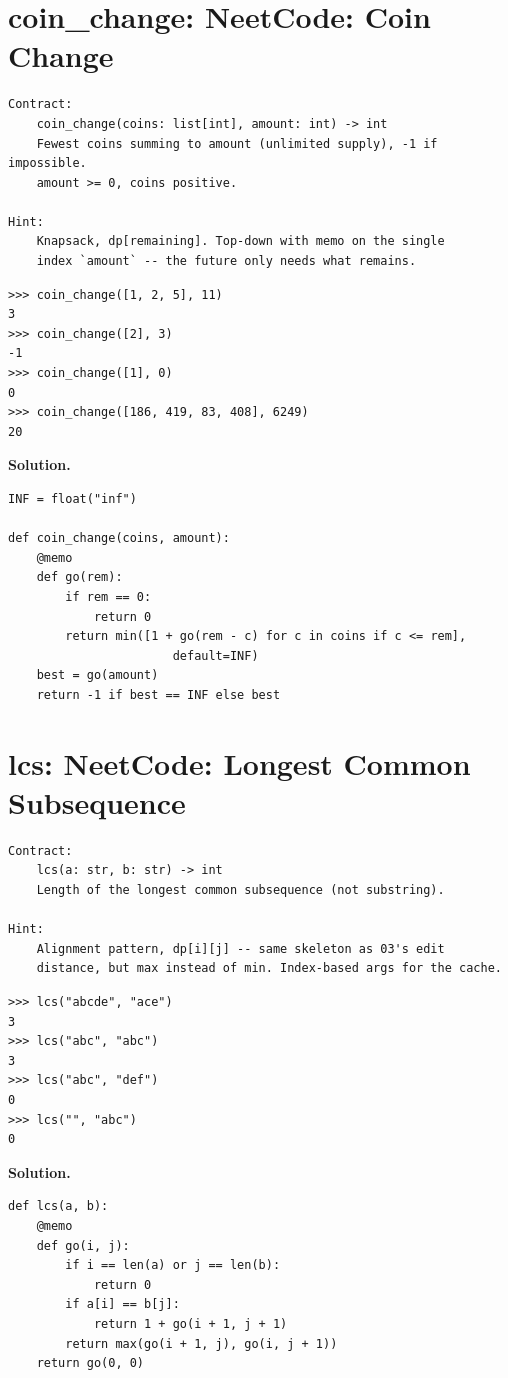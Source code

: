 \documentclass[10pt,letterpaper]{book}
\begin{document}
\section{coin\_change: NeetCode: Coin Change}
\begin{lstlisting}[style=ex]
Contract:
    coin_change(coins: list[int], amount: int) -> int
    Fewest coins summing to amount (unlimited supply), -1 if impossible.
    amount >= 0, coins positive.

Hint:
    Knapsack, dp[remaining]. Top-down with memo on the single
    index `amount` -- the future only needs what remains.
\end{lstlisting}
\begin{lstlisting}[style=ex]
>>> coin_change([1, 2, 5], 11)
3
>>> coin_change([2], 3)
-1
>>> coin_change([1], 0)
0
>>> coin_change([186, 419, 83, 408], 6249)
20
\end{lstlisting}
\noindent\textbf{Solution.}
\begin{lstlisting}[style=code]
INF = float("inf")

def coin_change(coins, amount):
    @memo
    def go(rem):
        if rem == 0:
            return 0
        return min([1 + go(rem - c) for c in coins if c <= rem],
                       default=INF)
    best = go(amount)
    return -1 if best == INF else best
\end{lstlisting}

\section{lcs: NeetCode: Longest Common Subsequence}
\begin{lstlisting}[style=ex]
Contract:
    lcs(a: str, b: str) -> int
    Length of the longest common subsequence (not substring).

Hint:
    Alignment pattern, dp[i][j] -- same skeleton as 03's edit
    distance, but max instead of min. Index-based args for the cache.
\end{lstlisting}
\begin{lstlisting}[style=ex]
>>> lcs("abcde", "ace")
3
>>> lcs("abc", "abc")
3
>>> lcs("abc", "def")
0
>>> lcs("", "abc")
0
\end{lstlisting}
\noindent\textbf{Solution.}
\begin{lstlisting}[style=code]
def lcs(a, b):
    @memo
    def go(i, j):
        if i == len(a) or j == len(b):
            return 0
        if a[i] == b[j]:
            return 1 + go(i + 1, j + 1)
        return max(go(i + 1, j), go(i, j + 1))
    return go(0, 0)
\end{lstlisting}
\end{document}
